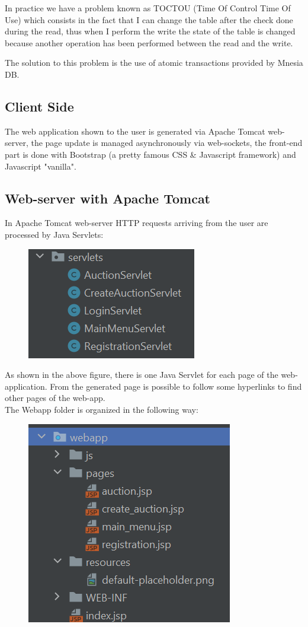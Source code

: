 \noindent In practice we have a problem known as TOCTOU (Time Of Control Time Of Use) which consists in the fact that I can change the table after the check done during the read, thus when I perform the write the state of the table is changed because another operation has been performed between the read and the write.

\noindent The solution to this problem is the use of atomic transactions provided by Mnesia DB.

\subsection{Client Side}
The web application shown to the user is generated via Apache Tomcat web-server, the page update is managed asynchronously via web-sockets, the front-end part is done with Bootstrap (a pretty famous CSS \& Javascript framework) and Javascript "vanilla". 

\subsection{Web-server with Apache Tomcat}
In Apache Tomcat web-server HTTP requests arriving from the user are processed by Java Servlets:\\

 \begin{figure}[H]
 	\centering
 	\includegraphics[width=0.4\linewidth]{img/servlets}
 	\caption{}
 	\label{fig:servlets}
 \end{figure}
 

\noindent As shown in the above figure, there is one Java Servlet for each page of the web-application. From the generated page is possible to follow some hyperlinks to find other pages of the web-app.\\
The Webapp folder is organized in the following way:
\begin{figure}[H]
	\centering
	\includegraphics[width=0.4\linewidth]{img/webapp}
	\caption{}
	\label{fig:webapp}
\end{figure}

